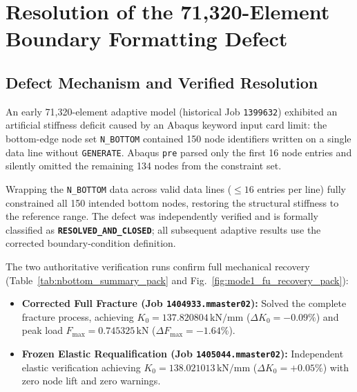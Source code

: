 \section{Resolution of the 71,320-Element Boundary Formatting Defect}
\label{sec:stiffness_anomaly_resolution}

\subsection{Defect Mechanism and Verified Resolution}
An early 71,320-element adaptive model (historical Job \texttt{1399632}) exhibited an artificial stiffness deficit caused by an Abaqus keyword input card limit: the bottom-edge node set \texttt{N\_BOTTOM} contained 150 node identifiers written on a single data line without \texttt{GENERATE}. Abaqus \texttt{pre} parsed only the first 16 node entries and silently omitted the remaining 134 nodes from the constraint set.

Wrapping the \texttt{N\_BOTTOM} data across valid data lines ($\le 16$ entries per line) fully constrained all 150 intended bottom nodes, restoring the structural stiffness to the reference range. The defect was independently verified and is formally classified as \textbf{\texttt{RESOLVED\_AND\_CLOSED}}; all subsequent adaptive results use the corrected boundary-condition definition.

The two authoritative verification runs confirm full mechanical recovery (Table~\ref{tab:nbottom_summary_pack} and Fig.~\ref{fig:mode1_fu_recovery_pack}):
\begin{itemize}[noitemsep,topsep=2pt]
  \item \textbf{Corrected Full Fracture (Job \texttt{1404933.mmaster02}):} Solved the complete fracture process, achieving $K_0 = 137.820804\,\mathrm{kN/mm}$ ($\Delta K_0 = -0.09\%$) and peak load $F_{\max} = 0.745325\,\mathrm{kN}$ ($\Delta F_{\max} = -1.64\%$).
  \item \textbf{Frozen Elastic Requalification (Job \texttt{1405044.mmaster02}):} Independent elastic verification achieving $K_0 = 138.021013\,\mathrm{kN/mm}$ ($\Delta K_0 = +0.05\%$) with zero node lift and zero warnings.
\end{itemize}

